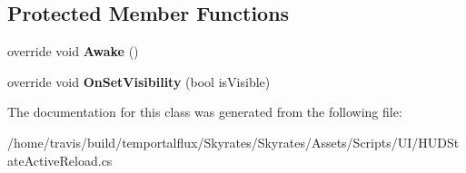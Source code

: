 \subsection*{Protected Member Functions}
\begin{DoxyCompactItemize}
\item 
\hypertarget{class_skyrates_1_1_u_i_1_1_h_u_d_state_active_reload_a187a02f6106306ec6e242d024446ca16}{override void {\bfseries Awake} ()}\label{class_skyrates_1_1_u_i_1_1_h_u_d_state_active_reload_a187a02f6106306ec6e242d024446ca16}

\item 
\hypertarget{class_skyrates_1_1_u_i_1_1_h_u_d_state_active_reload_a7e194796e2d0e509561e02f3c8498579}{override void {\bfseries On\-Set\-Visibility} (bool is\-Visible)}\label{class_skyrates_1_1_u_i_1_1_h_u_d_state_active_reload_a7e194796e2d0e509561e02f3c8498579}

\end{DoxyCompactItemize}


The documentation for this class was generated from the following file\-:\begin{DoxyCompactItemize}
\item 
/home/travis/build/temportalflux/\-Skyrates/\-Skyrates/\-Assets/\-Scripts/\-U\-I/H\-U\-D\-State\-Active\-Reload.\-cs\end{DoxyCompactItemize}
